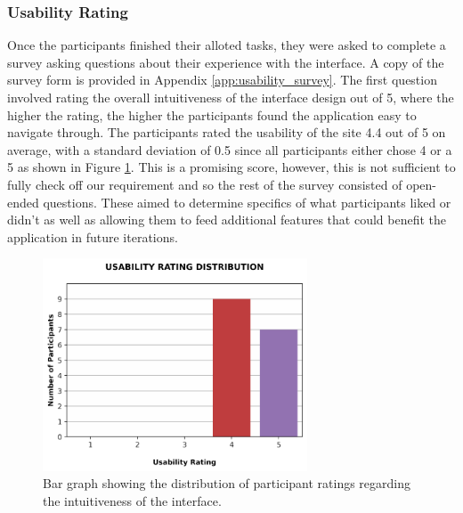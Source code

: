 \documentclass{l4proj}
\begin{document}
\subsubsection{Usability Rating}
Once the participants finished their alloted tasks, they were asked to complete a survey asking questions about their experience with the interface. A copy of the survey form is provided in Appendix \ref{app:usability_survey}. The first question involved rating the overall intuitiveness of the interface design out of 5, where the higher the rating, the higher the participants found the application easy to navigate through. The participants rated the usability of the site 4.4 out of 5 on average, with a standard deviation of 0.5 since all participants either chose 4 or a 5 as shown in Figure \ref{fig:rating_distribution}. This is a promising score, however, this is not sufficient to fully check off our requirement and so the rest of the survey consisted of open-ended questions. These aimed to determine specifics of what participants liked or didn't as well as allowing them to feed additional features that could benefit the application in future iterations.

\begin{figure}
    \centering
    \includegraphics[width=0.7\textwidth]{figures/rating_distribution.pdf}
    \caption{Bar graph showing the distribution of participant ratings regarding the intuitiveness of the interface.}
    \label{fig:rating_distribution}
\end{figure}
\end{document}
